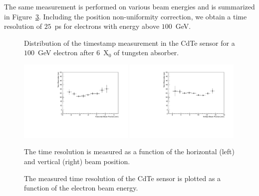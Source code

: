\documentclass[preprint,1p]{elsarticle}
\begin{document}
The same measurement is performed on various beam energies and is summarized
in Figure~\ref{fig:ChargeVsEnergy}. Including the position non-uniformity 
correction, we obtain a time resolution of $25$~ps for electrons with energy above $100$~GeV. 

\begin{figure}[htbp] 
\centering
\caption{Distribution of the timestamp measurement in the CdTe sensor for a $100$~GeV
electron after $6$~$\mathrm{X}_{0}$ of tungsten absorber. } 
\label{fig:DeltaT} 
\end{figure} 


\begin{figure}[htbp] 
\centering
\includegraphics[width=0.49\textwidth]{figures/TimeResolutionVsBeamHorizontalPosition.pdf} 
\includegraphics[width=0.49\textwidth]{figures/TimeResolutionVsBeamVerticalPosition.pdf} 
\caption{ The time resolution is measured as a function of the horizontal (left) and vertical (right)
beam position. }
\label{fig:TimeResolutionVsBeamXY} 
\end{figure} 




\begin{figure}[htbp] 
\centering
\caption{ The measured time resolution of the CdTe sensor is plotted as a function
of the electron beam energy. } 
\label{fig:ChargeVsEnergy} 
\end{figure} 
\end{document}
